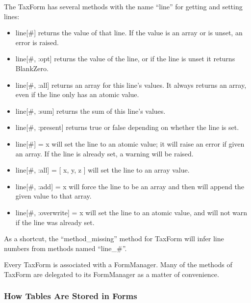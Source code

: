 \documentclass[12pt]{article}
\begin{document}
The TaxForm has several methods with the name ``line'' for getting and setting
lines:
\begin{itemize}
\item line[\#] returns the value of that line. If the value is an array or is
unset, an error is raised.
\item line[\#, :opt] returns the value of the line, or if the line is
unset it returns BlankZero.
\item line[\#, :all] returns an array for this line's values. It always returns
an array, even if the line only has an atomic value.
\item line[\#, :sum] returns the sum of this line's values.
\item line[\#, :present] returns true or false depending on whether the line is
set.
\item line[\#] = x will set the line to an atomic value; it will raise an error
if given an array. If the line is already set, a warning will be raised.
\item line[\#, :all] = [ x, y, z ] will set the line to an array value.
\item line[\#, :add] = x will force the line to be an array and then will append
the given value to that array.
\item line[\#, :overwrite] = x will set the line to an atomic value, and will
not warn if the line was already set.
\end{itemize}
As a shortcut, the ``method\_missing'' method for TaxForm will infer line
numbers from methods named ``line\_\#''.

Every TaxForm is associated with a FormManager. Many of the methods of TaxForm
are delegated to its FormManager as a matter of convenience.

\subsubsection{How Tables Are Stored in Forms}
\end{document}
